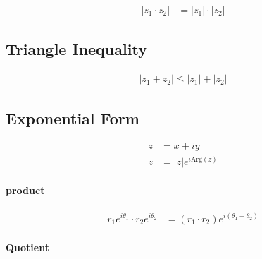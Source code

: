 \documentclass[12pt]{article}
\begin{document}
\begin{align*}
  |z_1 \cdot z_2| &= |z_1| \cdot |z_2|
\end{align*}

\subsection{Triangle Inequality}%
\label{sub:triangle_inequality}

\begin{align*}
  |z_1+z_2|\leq |z_1|+|z_2|
\end{align*}

\subsection{Exponential Form}%
\label{sub:exponential_form}

\begin{align*}
  z &= x+iy\\
  z &= |z|e^{i\text{Arg}(z)}
\end{align*}

\paragraph{product}%
\label{par:product}

\begin{align*}
  r_1e^{i\theta_1} \cdot r_2e^{i\theta_2} &= \left(r_1 \cdot
    r_2\right)e^{i\left(\theta_1 + \theta_2\right)}
\end{align*}

\paragraph{Quotient}%
\label{par:quotient}
\end{document}
